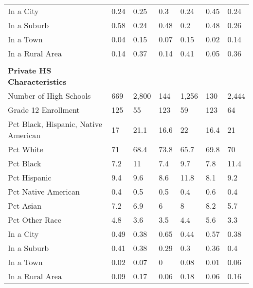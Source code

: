 \begin{longtabu}{X[4.5,l] X[1,c] X[1,c] X[1,c] X[1,c] X[1,c] X[1,c]}
\hspace{0.4cm}In a City&0.24&0.25&0.3&0.24&0.45&0.24\\%
\hspace{0.4cm}In a Suburb&0.58&0.24&0.48&0.2&0.48&0.26\\%
\hspace{0.4cm}In a Town&0.04&0.15&0.07&0.15&0.02&0.14\\%
\hspace{0.4cm}In a Rural Area&0.14&0.37&0.14&0.41&0.05&0.36\\%
&&&&&&\\%
\textbf{Private HS Characteristics}&\textbf{}&\textbf{}&\textbf{}&\textbf{}&\textbf{}&\textbf{}\\%
\hspace{0.4cm}Number of High Schools&669&2,800&144&1,256&130&2,444\\%
\hspace{0.4cm}Grade 12 Enrollment&125&55&123&59&123&64\\%
\hspace{0.4cm}Pct Black, Hispanic, Native American&17&21.1&16.6&22&16.4&21\\%
\hspace{0.4cm}Pct White&71&68.4&73.8&65.7&69.8&70\\%
\hspace{0.4cm}Pct Black&7.2&11&7.4&9.7&7.8&11.4\\%
\hspace{0.4cm}Pct Hispanic&9.4&9.6&8.6&11.8&8.1&9.2\\%
\hspace{0.4cm}Pct Native American&0.4&0.5&0.5&0.4&0.6&0.4\\%
\hspace{0.4cm}Pct Asian&7.2&6.9&6&8&8.2&5.7\\%
\hspace{0.4cm}Pct Other Race&4.8&3.6&3.5&4.4&5.6&3.3\\%
\hspace{0.4cm}In a City&0.49&0.38&0.65&0.44&0.57&0.38\\%
\hspace{0.4cm}In a Suburb&0.41&0.38&0.29&0.3&0.36&0.4\\%
\hspace{0.4cm}In a Town&0.02&0.07&0&0.08&0.01&0.06\\%
\hspace{0.4cm}In a Rural Area&0.09&0.17&0.06&0.18&0.06&0.16\\%
\end{longtabu}
\newpage
